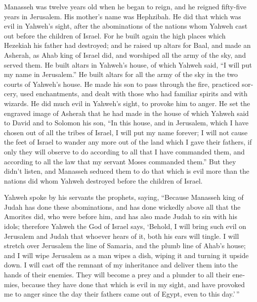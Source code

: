 \begin{paracol}{2}
\begin{otherlanguage}{english}
 Manasseh was twelve years old when he began to reign, and
he reigned fifty-five years in Jerusalem. His mother's name was
Hephzibah.  He did that which was evil in Yahweh's sight,
after the abominations of the nations whom Yahweh cast out before the
children of Israel.  For he built again the high places
which Hezekiah his father had destroyed; and he raised up altars for
Baal, and made an Asherah, as Ahab king of Israel did, and worshiped all
the army of the sky, and served them.  He built altars in
Yahweh's house, of which Yahweh said, ``I will put my name in
Jerusalem.''  He built altars for all the army of the sky
in the two courts of Yahweh's house.  He made his son to
pass through the fire, practiced sorcery, used enchantments, and dealt
with those who had familiar spirits and with wizards. He did much evil
in Yahweh's sight, to provoke him to anger.  He set the
engraved image of Asherah that he had made in the house of which Yahweh
said to David and to Solomon his son, ``In this house, and in Jerusalem,
which I have chosen out of all the tribes of Israel, I will put my name
forever;  I will not cause the feet of Israel to wander
any more out of the land which I gave their fathers, if only they will
observe to do according to all that I have commanded them, and according
to all the law that my servant Moses commanded them.'' 
But they didn't listen, and Manasseh seduced them to do that which is
evil more than the nations did whom Yahweh destroyed before the children
of Israel.

 Yahweh spoke by his servants the prophets, saying,
 ``Because Manasseh king of Judah has done these
abominations, and has done wickedly above all that the Amorites did, who
were before him, and has also made Judah to sin with his idols;
 therefore Yahweh the God of Israel says, `Behold, I will
bring such evil on Jerusalem and Judah that whoever hears of it, both
his ears will tingle.  I will stretch over Jerusalem the
line of Samaria, and the plumb line of Ahab's house; and I will wipe
Jerusalem as a man wipes a dish, wiping it and turning it upside down.
 I will cast off the remnant of my inheritance and
deliver them into the hands of their enemies. They will become a prey
and a plunder to all their enemies,  because they have
done that which is evil in my sight, and have provoked me to anger since
the day their fathers came out of Egypt, even to this day.'\,''


\end{otherlanguage}
\end{paracol}
